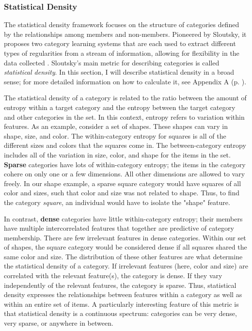 \documentclass[../dissertation.tex]{subfiles}
\begin{document}
\subsubsection{Statistical Density}

The statistical density framework focuses on the structure of categories defined by the relationships among members and non-members. Pioneered by Sloutsky, it proposes two category learning systems that are each used to extract different types of regularities from a stream of information, allowing for flexibility in the data collected \citep{Sloutsky2010}. Sloutsky's main metric for describing categories is called \textit{statistical density}. In this section, I will describe statistical density in a broad sense; for more detailed information on how to calculate it, see Appendix A (p. \pageref{appendixA}). \par
	The statistical density of a category is related to the ratio between the amount of entropy within a target category and the entropy between the target category and other categories in the set. In this context, entropy refers to variation within features. As an example, consider a set of shapes. These shapes can vary in shape, size, and color. The within-category entropy for squares is all of the different sizes and colors that the squares come in. The between-category entropy includes all of the variation in size, color, and shape for the items in the set. \textbf{Sparse} categories have lots of within-category entropy; the items in the category cohere on only one or a few dimensions. All other dimensions are allowed to vary freely. In our shape example, a sparse square category would have squares of all color and sizes, such that color and size was not related to shape. Thus, to find the category \textit{square}, an individual would have to isolate the "shape" feature. \par
	In contrast, \textbf{dense} categories have little within-category entropy; their members have multiple intercorrelated features that together are predictive of category membership. There are few irrelevant features in dense categories. Within our set of shapes, the square category would be considered dense if all squares shared the same color and size. The distribution of these other features are what determine the statistical density of a category. If irrelevant features (here, color and size) are correlated with the relevant feature(s), the category is dense. If they vary independently of the relevant features, the category is sparse. Thus, statistical density expresses the relationships between features within a category as well as within an entire set of items. A particularly interesting feature of this metric is that statistical density is a continuous spectrum: categories can be very dense, very sparse, or anywhere in between. \par 
\end{document}
